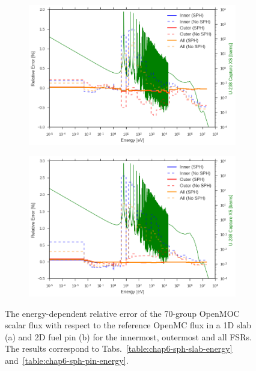 \begin{figure}[h!]
\begin{subfigure}{.9\textwidth}
  \centering
  \includegraphics[width=\linewidth]{figures/sph/slab/rel-err-inner-outer}
  \caption{}
\end{subfigure}
\begin{subfigure}{.9\textwidth}
  \centering
  \includegraphics[width=\linewidth]{figures/sph/pin-cell/rel-err-inner-outer}
  \caption{}
\end{subfigure}
\caption[Flux relative error by energy group with SPH]{The energy-dependent relative error of the 70-group OpenMOC scalar flux with respect to the reference OpenMC flux in a 1D slab (a) and 2D fuel pin (b) for the innermost, outermost and all \ac{FSR}s. The results correspond to Tabs.~\ref{table:chap6-sph-slab-energy} and~\ref{table:chap6-sph-pin-energy}.}
\label{fig:chap6-rel-err-energy}
\end{figure}

